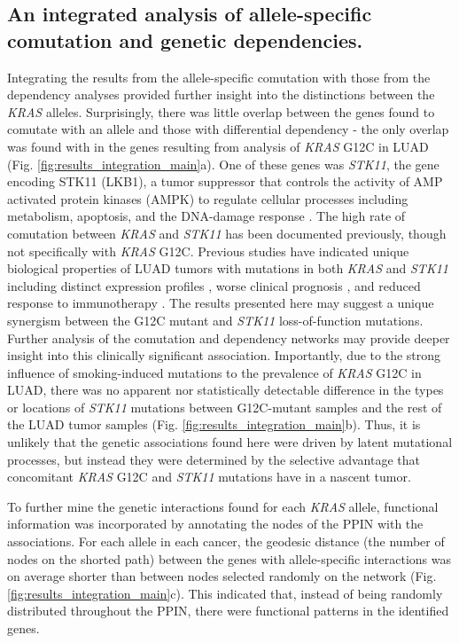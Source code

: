\documentclass[english, 10pt, letterpaper]{article}
\newcommand{\KRAS}{\emph{KRAS}}
\begin{document}
\subsection*{An integrated analysis of allele-specific comutation and genetic dependencies.}

Integrating the results from the allele-specific comutation with those from the dependency analyses provided further insight into the distinctions between the \KRAS{} alleles.
Surprisingly, there was little overlap between the genes found to comutate with an allele and those with differential dependency - the only overlap was found with in the genes resulting from analysis of \KRAS{} G12C in LUAD (Fig. \ref{fig:results_integration_main}a).
One of these genes was \emph{STK11}, the gene encoding STK11 (LKB1), a tumor suppressor that controls the activity of AMP activated protein kinases (AMPK) to regulate cellular processes including metabolism, apoptosis, and the DNA-damage response \cite{Momcilovic2015TargetingVulnerabilities., Korsse2013TargetingCancer.}.
The high rate of comutation between \KRAS{} and \emph{STK11} has been documented previously, though not specifically with \KRAS{} G12C.
Previous studies have indicated unique biological properties of LUAD tumors with mutations in both \KRAS{} and \emph{STK11} including distinct expression profiles \cite{Skoulidis2015Co-occurringVulnerabilities.}, worse clinical prognosis \cite{LaFleur2019MutationSTK11, Bange2019ImpactCancer.}, and reduced response to immunotherapy \cite{Skoulidis2018STK11/LKB1Adenocarcinoma.}.
The results presented here may suggest a unique synergism between the G12C mutant and \emph{STK11} loss-of-function mutations.
Further analysis of the comutation and dependency networks may provide deeper insight into this clinically significant association.
Importantly, due to the strong influence of smoking-induced mutations to the prevalence of \KRAS{} G12C in LUAD, there was no apparent nor statistically detectable difference in the types or locations of \emph{STK11} mutations between G12C-mutant samples and the rest of the LUAD tumor samples (Fig. \ref{fig:results_integration_main}b).
Thus, it is unlikely that the genetic associations found here were driven by latent mutational processes, but instead they were determined by the selective advantage that concomitant \KRAS{} G12C and \emph{STK11} mutations have in a nascent tumor.

To further mine the genetic interactions found for each \KRAS{} allele, functional information was incorporated by annotating the nodes of the PPIN with the associations.
For each allele in each cancer, the geodesic distance (the number of nodes on the shorted path) between the genes with allele-specific interactions was on average shorter than between nodes selected randomly on the network (Fig. \ref{fig:results_integration_main}c).
This indicated that, instead of being randomly distributed throughout the PPIN, there were functional patterns in the identified genes.
\end{document}
